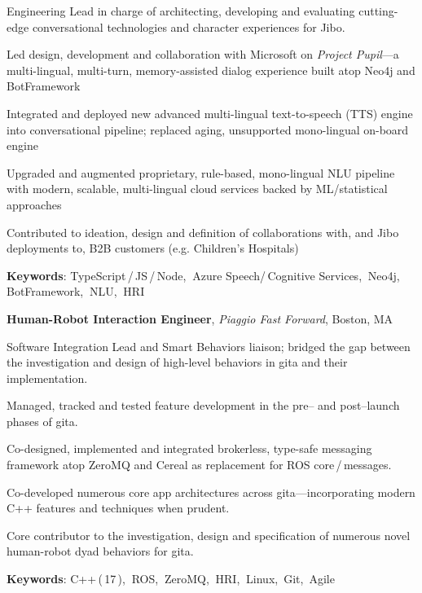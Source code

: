 \documentclass[10pt, letter]{article}
\newcommand{\years}[1]{\marginnote{\footnotesize #1}}
\newenvironment{desc*}{
  \begin{description}
    \setlength{\itemsep}{0.2pt}
    \setlength{\parskip}{-1pt}
    \setlength{\parsep}{0pt}
  }{
  \end{description}
}
\begin{document}
Engineering Lead in charge of architecting, developing and evaluating cutting-edge conversational technologies
and character experiences for Jibo.
\begin{itemize}[leftmargin=*, parsep=0pt, rightmargin=1.5cm]
  {\light
\item Led design, development and collaboration with Microsoft on \textit{Project Pupil}---a
  multi-lingual, multi-turn, memory-assisted dialog experience built atop Neo4j and BotFramework
\item Integrated and deployed new advanced multi-lingual text-to-speech (TTS) engine into
  conversational pipeline; replaced aging, unsupported mono-lingual on-board engine
\item Upgraded and augmented proprietary, rule-based, mono-lingual NLU pipeline with modern,
  scalable, multi-lingual cloud services backed by ML/statistical approaches
\item Contributed to ideation, design and definition of collaborations with, and Jibo deployments
  to, B2B customers (e.g. Children's Hospitals)
  }
\end{itemize}
\begin{desc*}
\item[\rm \color{redblue} \textbf{Keywords}:] TypeScript\,/\,JS\,/\,Node,$\:$ Azure Speech/\,Cognitive Services,$\:$ Neo4j,$\:$ BotFramework,$\:$ NLU,$\:$ HRI \bigbreak
\end{desc*}

\years{2018 -- 2020} 
\textbf{\fontsize{10.5pt}{1em}\selectfont Human-Robot Interaction Engineer},
\textit{Piaggio Fast Forward}, Boston, MA\bigskip

Software Integration Lead and Smart Behaviors liaison; bridged the gap between the investigation and
design of high-level behaviors in gita and their implementation.
\begin{itemize}[leftmargin=*, parsep=0pt, rightmargin=1.5cm]
  {\light
\item Managed, tracked and tested feature development in the pre-- and post--launch phases of gita.
\item Co-designed, implemented and integrated brokerless, type-safe messaging framework
  atop ZeroMQ and Cereal as replacement for ROS core\,/\,messages.
\item Co-developed numerous core app architectures across gita---incorporating modern C++
  features and techniques when prudent.
\item Core contributor to the investigation, design and specification of numerous novel
  human-robot dyad behaviors for gita.
  }
\end{itemize}
\begin{desc*}
\item[\rm \color{redblue} \textbf{Keywords}:] C++\,(\,17\,),$\:$ ROS,$\:$ ZeroMQ,$\:$ HRI,$\:$ Linux,$\,$ Git,$\,$ Agile \bigbreak
\end{desc*}
\end{document}
